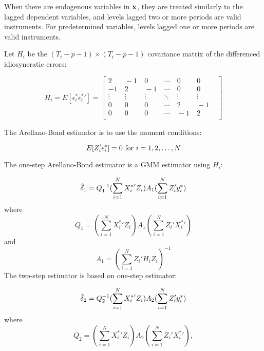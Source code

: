 When there are endogenous variables in $\bf x$, they are treated similarly to the lagged dependent variables, and levels lagged two or more periods are valid instruments.  For predetermined variables, levels lagged one or more periods are valid instruments.

Let $H_i$ be the $(T_i - p -1) \times (T_i -p -1)$ covariance matrix of the differenced idiosyncratic errors:

\begin{equation}
H_i = E[\epsilon_i^* {\epsilon_i^*}'] =
\begin{bmatrix}
2 & \ -1 & \ 0 & \  \cdots & \ 0 & \  0 &  \\ -1 & \ 2 & \ -1 & \  \cdots & \ 0 & \  0 &  \\ \vdots & \ \vdots & \ \vdots & \  \ddots & \ \vdots & \  \vdots &  \\ 0 & \ 0 & \ 0 & \  \cdots & \ 2 & \ -1 &  \\ 0 & \  0 & \ 0 & \  \cdots & \ -1 & \  2 &  \\ 
\end{bmatrix}
\end{equation}

The Arellano-Bond estimator is to use the moment conditions:

\begin{equation}
E [Z_i' \epsilon_i^* ] = 0 \ {\rm for } \ i=1,2, \dots, N
\end{equation}

The one-step Arellano-Bond estimator is a GMM estimator using $H_i$:

\begin{equation}
\hat {\bf \delta}_1= Q_1^{-1} (\sum_{i=1}^N {X_i^*}' Z_i) A_1 (\sum_{i=1}^N Z_i' y_i^*)
\end{equation}
where 
\begin{equation}
Q_1 =  (\sum_{i=1}^N {X_i^*}' Z_i) A_1 (\sum_{i=1}^N Z_i' {X_i^*}')
\end{equation}
and 
\begin{equation}
A_1 =  (\sum_{i=1}^N {Z_i}' H_i Z_i)^{-1}
\end{equation}
The two-step estimator is based on one-step estimator:

\begin{equation}
\hat {\bf \delta}_2= Q_2^{-1} (\sum_{i=1}^N {X_i^*}' Z_i) A_2 (\sum_{i=1}^N Z_i' y_i^*)
\end{equation}
where 
\begin{equation}
Q_2 =  (\sum_{i=1}^N {X_i^*}' Z_i) A_2 (\sum_{i=1}^N Z_i' {X_i^*}'),
\end{equation}

